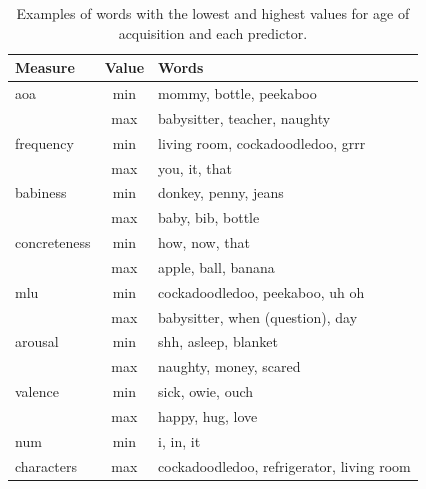 \documentclass[10pt, letterpaper]{article}
\begin{document}
\setlength\tabcolsep{1pt}

\begin{table}[b!]
\centering
\begin{tabular}{lcl}
  \hline
Measure & Value & Words \\ 
  \hline
aoa & min & mommy, bottle, peekaboo \\ 
   & max & babysitter, teacher, naughty \\ 
  frequency & min & living room, cockadoodledoo, grrr \\ 
   & max & you, it, that \\ 
  babiness & min & donkey, penny, jeans \\ 
   & max & baby, bib, bottle \\ 
  concreteness & min & how, now, that \\ 
   & max & apple, ball, banana \\ 
  mlu & min & cockadoodledoo, peekaboo, uh oh \\ 
   & max & babysitter, when (question), day \\ 
  arousal & min & shh, asleep, blanket \\ 
   & max & naughty, money, scared \\ 
  valence & min & sick, owie, ouch \\ 
   & max & happy, hug, love \\ 
  num & min & i, in, it \\ 
  characters & max & cockadoodledoo, refrigerator, living room \\ 
   \hline
\end{tabular}
\caption{Examples of words with the lowest and highest values for age of acquisition and each predictor.} 
\label{table:extremes}
\end{table}
\end{document}

